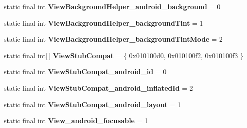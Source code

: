 \begin{DoxyCompactItemize}
\item 
\hypertarget{classandroid_1_1support_1_1design_1_1_r_1_1styleable_ac20c4e59460f7e880c63b69c5b38b04e}{}static final int {\bfseries View\+Background\+Helper\+\_\+android\+\_\+background} = 0\label{classandroid_1_1support_1_1design_1_1_r_1_1styleable_ac20c4e59460f7e880c63b69c5b38b04e}

\item 
\hypertarget{classandroid_1_1support_1_1design_1_1_r_1_1styleable_af1863103f3bd67eddcd4df9bc5602067}{}static final int {\bfseries View\+Background\+Helper\+\_\+background\+Tint} = 1\label{classandroid_1_1support_1_1design_1_1_r_1_1styleable_af1863103f3bd67eddcd4df9bc5602067}

\item 
\hypertarget{classandroid_1_1support_1_1design_1_1_r_1_1styleable_a10377d2903195cc827b6074c9a338504}{}static final int {\bfseries View\+Background\+Helper\+\_\+background\+Tint\+Mode} = 2\label{classandroid_1_1support_1_1design_1_1_r_1_1styleable_a10377d2903195cc827b6074c9a338504}

\item 
\hypertarget{classandroid_1_1support_1_1design_1_1_r_1_1styleable_a9d1ab53e5b97dd9ed9bd6109532344ef}{}static final int\mbox{[}$\,$\mbox{]} {\bfseries View\+Stub\+Compat} = \{ 0x010100d0, 0x010100f2, 0x010100f3 \}\label{classandroid_1_1support_1_1design_1_1_r_1_1styleable_a9d1ab53e5b97dd9ed9bd6109532344ef}

\item 
\hypertarget{classandroid_1_1support_1_1design_1_1_r_1_1styleable_a28232eb26205dd7d1926081f2535ab1e}{}static final int {\bfseries View\+Stub\+Compat\+\_\+android\+\_\+id} = 0\label{classandroid_1_1support_1_1design_1_1_r_1_1styleable_a28232eb26205dd7d1926081f2535ab1e}

\item 
\hypertarget{classandroid_1_1support_1_1design_1_1_r_1_1styleable_a72e44c4ee2da3d0d5ad9c3780f98d454}{}static final int {\bfseries View\+Stub\+Compat\+\_\+android\+\_\+inflated\+Id} = 2\label{classandroid_1_1support_1_1design_1_1_r_1_1styleable_a72e44c4ee2da3d0d5ad9c3780f98d454}

\item 
\hypertarget{classandroid_1_1support_1_1design_1_1_r_1_1styleable_ae3ebfa5defbb371675ed847339ac19af}{}static final int {\bfseries View\+Stub\+Compat\+\_\+android\+\_\+layout} = 1\label{classandroid_1_1support_1_1design_1_1_r_1_1styleable_ae3ebfa5defbb371675ed847339ac19af}

\item 
\hypertarget{classandroid_1_1support_1_1design_1_1_r_1_1styleable_a011b87eb64cd314c6de1fcb3394fcb1d}{}static final int {\bfseries View\+\_\+android\+\_\+focusable} = 1\label{classandroid_1_1support_1_1design_1_1_r_1_1styleable_a011b87eb64cd314c6de1fcb3394fcb1d}


\end{DoxyCompactItemize}
